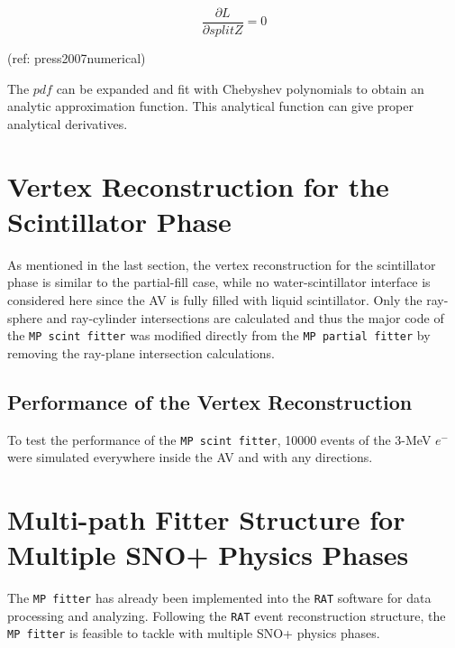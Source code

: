 \[
\frac{\partial L}{\partial splitZ} = 0
\]

(ref: press2007numerical)


The $pdf$ can be expanded and fit with Chebyshev polynomials to obtain an analytic approximation function\cite{press2007numerical}. This analytical function can give proper analytical derivatives.






\section{Vertex Reconstruction for the Scintillator Phase}\label{sect:scintFitter}
As mentioned in the last section, the vertex reconstruction for the scintillator phase is similar to the partial-fill case, while no water-scintillator interface is considered here since the AV is fully filled with liquid scintillator. Only the ray-sphere and ray-cylinder intersections are calculated and thus the major code of the \texttt{MP scint fitter} was modified directly from the \texttt{MP partial fitter} by removing the ray-plane intersection calculations.

\subsection{Performance of the Vertex Reconstruction}
To test the performance of the \texttt{MP scint fitter}, 10000 events of the 3-MeV $e^-$ were simulated everywhere inside the AV and with any directions.





 



\section{Multi-path Fitter Structure for Multiple SNO+ Physics Phases}

The \texttt{MP fitter} has already been implemented into the \texttt{RAT} software for data processing and analyzing. Following the \texttt{RAT} event reconstruction structure, the \texttt{MP fitter} is feasible to tackle with multiple SNO+ physics phases. 

